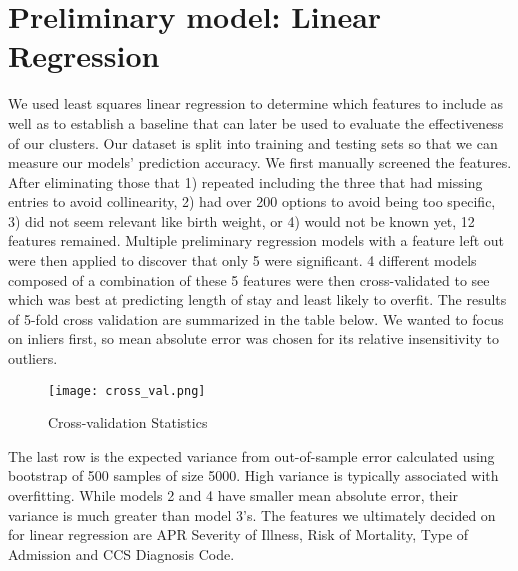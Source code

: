 \documentclass{article}
\begin{document}
\section{Preliminary model: Linear Regression}
We used least squares linear regression to determine which features to include as well as to establish a baseline that can later be used to evaluate the effectiveness of our clusters. Our dataset is split into training and testing sets so that we can measure our models’ prediction accuracy.
\newline
We first manually screened the features. After eliminating those that 1) repeated including the three that had missing entries to avoid collinearity, 2) had over 200 options to avoid being too specific, 3) did not seem relevant like birth weight, or 4) would not be known yet, 12 features remained. Multiple preliminary regression models with a feature left out were then applied to discover that only 5 were significant. 4 different models composed of a combination of these 5 features were then cross-validated to see which was best at predicting length of stay and least likely to overfit. 
\newline
The results of 5-fold cross validation are summarized in the table below. We wanted to focus on inliers first, so mean absolute error was chosen for its relative insensitivity to outliers.
\begin{figure}[h!]
\centering
\texttt{[image: cross\_val.png]}
\caption{Cross-validation Statistics}
\end{figure}
\newline
The last row is the expected variance from out-of-sample error calculated using bootstrap of 500 samples of size 5000. High variance is typically associated with overfitting. While models 2 and 4 have smaller mean absolute error, their variance is much greater than model 3’s. The features we ultimately decided on for linear regression are APR Severity of Illness, Risk of Mortality, Type of Admission and CCS Diagnosis Code.
\end{document}
